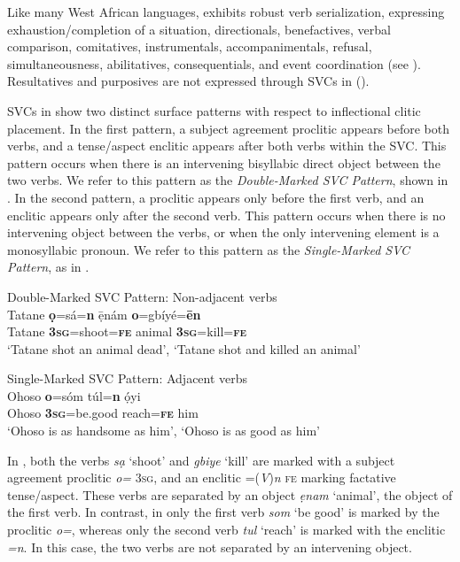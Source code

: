 \documentclass[output=paper]{langsci/langscibook}
\begin{document}
Like many West African languages,  exhibits robust verb serialization, expressing exhaustion/completion of a situation, directionals, benefactives, verbal comparison, comitatives, instrumentals, accompanimentals, refusal, simultaneousness, abilitatives, consequentials, and event coordination (see \citealt{Kari2003a}). Resultatives and purposives are not expressed through SVCs in  (\citealt[59--60, 206]{Kari2004}).

SVCs in  show two distinct surface patterns with respect to inflectional clitic placement. In the first pattern, a subject agreement proclitic appears before both verbs, and a tense/aspect enclitic appears after both verbs within the SVC. This pattern occurs when there is an intervening bisyllabic direct object between the two verbs. We refer to this pattern as the \textit{Double-Marked SVC Pattern}, shown in . In the second pattern, a proclitic appears only before the first verb, and an enclitic appears only after the second verb. This pattern occurs when there is no intervening object between the verbs, or when the only intervening element is a monosyllabic pronoun. We refer to this pattern as the \textit{Single-Marked SVC Pattern}, as in .

\ea\label{ex:rolle:9}
{Double-Marked SVC Pattern: Non-adjacent verbs}\\
\gll  Tatane  \textbf{ọ}=sá=\textbf{n}      ẹ̄nám  \textbf{o}=gbíyé=\textbf{ēn}\\
     Tatane  \textbf{3}\textbf{\textsc{sg}}=shoot=\textbf{\textsc{fe}}  animal  \textbf{3}\textbf{\textsc{sg}}=kill=\textbf{\textsc{fe}}\\
\glt ‘Tatane shot an animal dead’, ‘Tatane shot and killed an animal’
\z

\ea\label{ex:rolle:10}
{Single-Marked SVC Pattern: Adjacent verbs}\\
\gll  Ohoso   \textbf{o}=sóm       túl=\textbf{n}     ọ́yi\\
     Ohoso  \textbf{3}\textbf{\textsc{sg}}=be.good    reach=\textbf{\textsc{fe}}  him\\
\glt ‘Ohoso is as handsome as him’, ‘Ohoso is as good as him’
\z

In , both the verbs \textit{sạ} ‘shoot’ and \textit{gbiye} ‘kill’ are marked with a subject agreement proclitic \textit{o=} \textsc{3sg}, and an enclitic =(\textit{V})\textit{n} \textsc{fe} marking factative tense/aspect. These verbs are separated by an object \textit{ẹnam} ‘animal’, the object of the first verb. In contrast, in  only the first verb \textit{som} ‘be good’ is marked by the proclitic \textit{o=}, whereas only the second verb \textit{tul} ‘reach’ is marked with the enclitic \textit{=n}. In this case, the two verbs are not separated by an intervening object. 
\end{document}
